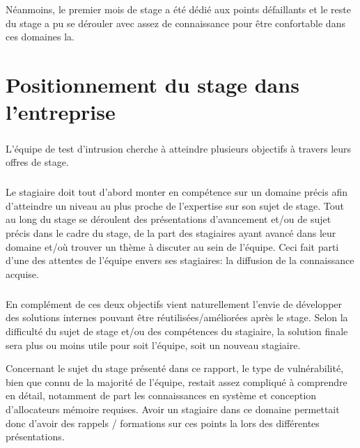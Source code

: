 Néanmoins, le premier mois de stage a été dédié aux points défaillants et le reste du stage a pu se dérouler avec assez de connaissance
pour être confortable dans ces domaines la.

\subparagraph{}


\section*{Positionnement du stage dans l'entreprise}
\paragraph{}
\subparagraph{}
L'équipe de test d'intrusion cherche à atteindre plusieurs objectifs à travers leurs offres de stage.
\subparagraph{}
Le stagiaire doit tout d'abord monter en compétence sur un domaine précis afin d'atteindre un niveau au plus proche de l'expertise sur son sujet de stage.\newline
Tout au long du stage se déroulent des présentations d'avancement et/ou de sujet précis dans le cadre du stage, de la part des stagiaires ayant avancé dans leur domaine et/où trouver un thème à discuter au sein de l'équipe. Ceci fait parti d'une des attentes de l'équipe envers ses stagiaires: la diffusion de la connaissance acquise.
\subparagraph{}
En complément de ces deux objectifs vient naturellement l'envie de développer des solutions internes pouvant être réutilisées/améliorées après le stage. Selon la difficulté du sujet de stage
et/ou des compétences du stagiaire, la solution finale sera plus ou moins utile pour soit l'équipe, soit un nouveau stagiaire.\newline

Concernant le sujet du stage présenté dans ce rapport, le type de vulnérabilité, bien que connu de la majorité de l'équipe, restait assez compliqué à comprendre en détail,
notamment de part les connaissances en système et conception d'allocateurs mémoire requises. Avoir un stagiaire dans ce domaine permettait donc d'avoir des
rappels / formations sur ces points la lors des différentes présentations.

